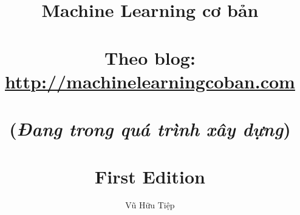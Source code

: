 \documentclass[envcountsame,envcountchap, openany]{mysvmono}
\begin{document}
\author{Vũ Hữu Tiệp}
\title{{\bf Machine Learning cơ bản}\\
\\
\small{\bf Theo blog: \url{http://machinelearningcoban.com}} \\
\\
\small{(\textit{Đang trong quá trình xây dựng})}\\
\\
{\small First Edition}}
\maketitle

\frontmatter%

% 
% 
\tableofcontents



\mainmatter%
% 
% 





%
%

\backmatter%
% 
% 
\printindex

\end{document}
